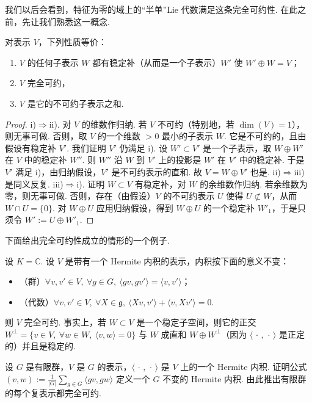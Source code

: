 \begin{numpara}\label{np:ssl-2-1-8}
我们以后会看到，特征为零的域上的``半单''Lie 代数满足这条完全可约性. 在此之前，先让我们熟悉这一概念.
\begin{lemma*}
对表示 $V$，下列性质等价：
\begin{enumerate}[label=\roman*)]
\item $V$ 的任何子表示 $W$ 都有稳定补（从而是一个子表示）$W'$ 使 $W' \oplus W = V$；
\item $V$ 完全可约，
\item $V$ 是它的不可约子表示之和.
\end{enumerate}
\end{lemma*}
\begin{proof}
i)$\Rightarrow$ii). 对 $V$ 的维数作归纳. 若 $V$ 不可约（特别地，若 $\dim(V) = 1$），则无事可做. 否则，取 $V$ 的一个维数 $> 0$ 最小的子表示 $W$. 它是不可约的，且由假设有稳定补 $V'$. 我们证明 $V'$ 仍满足 i). 设 $W' \subset V'$ 是一个子表示，取 $W \oplus W'$ 在 $V$ 中的稳定补 $W''$. 则 $W''$ 沿 $W$ 到 $V'$ 上的投影是 $W'$ 在 $V'$ 中的稳定补. 于是 $V'$ 满足 i)，由归纳假设，$V'$ 是不可约表示的直和. 故 $V = W \oplus V'$ 也是.
ii)$\Rightarrow$iii) 是同义反复.
iii)$\Rightarrow$i). 证明 $W \subset V$ 有稳定补，对 $W$ 的余维数作归纳. 若余维数为零，则无事可做. 否则，存在（由假设）$V$ 的不可约表示 $U$ 使得 $U \not\subset W$，从而 $W \cap U = \{0\}$. 对 $W \oplus U$ 应用归纳假设，得到 $W \oplus U$ 的一个稳定补 $W'_1$，于是只须令 $W' := U \oplus W'_1$.
\end{proof}
下面给出完全可约性成立的情形的一个例子.
\begin{example*}
设 $K = \mathbb{C}$. 设 $V$ 是带有一个 Hermite 内积的表示，内积按下面的意义不变：
\begin{itemize}[label=\textendash]
\item （群）$\forall v, v' \in V,\ \forall g \in G,\ \langle gv, gv'\rangle = \langle v, v'\rangle$；
\item （代数）$\forall v, v' \in V,\ \forall X \in \mathfrak{g},\ \langle Xv, v'\rangle + \langle v, Xv'\rangle = 0$.
\end{itemize}
则 $V$ 完全可约. 事实上，若 $W \subset V$ 是一个稳定子空间，则它的正交 $W^{\perp} = \{v \in V,\ \forall w \in W,\ \langle v, w\rangle = 0\}$ 与 $W$ 成直和 $W \oplus W^{\perp}$（因为 $\langle\,\cdot\,,\,\cdot\,\rangle$ 是正定的）并且是稳定的.
\end{example*}
\begin{exercise*}
设 $G$ 是有限群，$V$ 是 $G$ 的表示，$\langle\,\cdot\,,\,\cdot\,\rangle$ 是 $V$ 上的一个 Hermite 内积. 证明公式 $(v, w) := \frac{1}{|G|}\sum_{g \in G} \langle gv, gw\rangle$ 定义一个 $G$ 不变的 Hermite 内积. 由此推出有限群的每个复表示都完全可约.
\end{exercise*}
\end{numpara}

